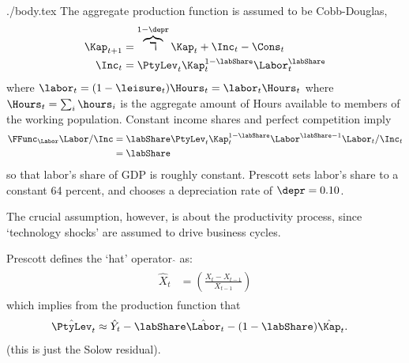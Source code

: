 \documentclass{handout}
\begin{document}
\begin{verbatimwrite}{./body.tex}
The aggregate production function is assumed to be Cobb-Douglas,
\begin{equation}\begin{gathered}\begin{aligned}
        \Kap_{t+1} & =  \overbrace{\daleth}^{1-\depr} \Kap_{t}+\Inc_{t}-\Cons_{t}  \\
        \Inc_{t} & =  \PtyLev_{t}\Kap_{t}^{1-\labShare}\Labor_{t}^{\labShare}
\end{aligned}\end{gathered}\end{equation}
where $\labor_{t} = (1-\leisure_{t})\Hours_{t} = \labor_{t}\Hours_{t}$
where $\Hours_{t}=\sum_{i} \hours_{i}$ is the aggregate amount of
Hours available to members of the working population. Constant income
shares and perfect competition imply
\begin{equation}\begin{gathered}\begin{aligned}
        \FFunc_{\Labor}\Labor/\Inc & =  \labShare \PtyLev_{t}\Kap_{t}^{1-\labShare}\Labor^{\labShare-1}\Labor_{t}/\Inc_{t}  \\
         & =  \labShare
\end{aligned}\end{gathered}\end{equation}
so that labor's share of GDP is roughly constant.  Prescott sets 
labor's share to a constant 64 percent, and chooses a depreciation 
rate of $\depr = 0.10$.

The crucial assumption, however, is about the productivity process, 
since `technology shocks' are assumed to drive business cycles.

Prescott defines the `hat' operator $\hat{}$ as:
\begin{equation}\begin{gathered}\begin{aligned}
        \hat{X}_{t} & =  \left(\frac{X_{t}-X_{t-1}}{X_{t-1}}\right)
\end{aligned}\end{gathered}\end{equation}
which implies from the production function that
\begin{equation}\begin{gathered}\begin{aligned}
        \hat{\PtyLev}_{t} & \approx  \hat{Y}_{t}-\labShare \hat{\Labor}_{t} - (1-\labShare)\hat{\Kap}_{t}.
\end{aligned}\end{gathered}\end{equation}
(this is just the Solow residual).


\end{verbatimwrite}
\end{document}
